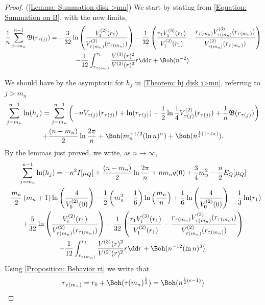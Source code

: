 \begin{proof} (\autoref{Lemma: Summation disk >mn})
	We start by stating from \eqref{Equation: Summation on B}, with the new limits,
	\begin{multline}
					\frac{1}{n} \sum_{j=m_n}^{n-1} \mathfrak{B}(r_{\tau(j)})  = - \frac{3}{32} \ln\left( \frac{V^{(2)}_1(r_1)}{V^{(2)}_{\tau(m_n)}(r_{\tau(m_n)})} \right) - \frac{1}{32} \left( \frac{r_1  V^{(3)}_1(r_1)}{V^{(2)}_1(r_1)} - \frac{r_{\tau(m_n)} V^{(3)}_{\tau(m_n)}(r_{\tau(m_n)})}{V^{(2)}_{\tau(m_n)}(r_{\tau(m_n)})}\right) \\ - \frac{1}{12} \int_{r_{\tau(m_n)}}^{r_1} \frac{V^{(3)}(r)^2}{V^{(2)}(r)^{2}} r \dd r + \Boh(n^{-2}).
	\end{multline}
	
	We should have by the asymptotic for $h_j$ in \autoref{Theorem: hj disk j>mn}, referring to $j > m_n$
	\begin{multline}
		\sum_{j=m_n}^{n-1} \ln (h_j) = 	\sum_{j=m_n}^{n-1}  \left( -n V_{\tau(j)}(r_{\tau(j)}) + \ln(r_{\tau(j)}) -\frac{1}{2} \ln \frac{1}{4}V^{(2)}_{\tau(j)}(r_{\tau(j)}) + \frac{1}{n} \mathfrak{B}(r_{\tau(j)}) \right) \\ + \frac{(n-m_n)}{2} \ln{\frac{2\pi}{n}} + \Boh(m_n^{-1/2} (\ln n)^\alpha) + \Boh(n^{\frac{1}{2}(1-5\epsilon)}).
	\end{multline}
	By the lemmas just proved, we write, as $n \rightarrow \infty$,
	\begin{multline}
		\sum_{j=m_n}^{n-1} \ln (h_j) = -n^2 I[\mu_Q] + \frac{(n-m_n)}{2} \ln{\frac{2\pi}{n}} +  n m_n q(0) + \frac{3}{4} m_n^2 - \frac{n}{2} E_Q[\mu_Q] \\ - \frac{m_n}{2} \left(m_n + 1\right) \ln{\left(\frac{4}{V^{(2)}_0(0)}\right)} - \frac{1}{2} \left( m_n^2 - \frac{1}{6} \right) \ln{\left(\frac{m_n}{n}\right)} + \frac{1}{6} \ln{\left(\frac{4}{V^{(2)}_0(0)}\right)} - \frac{1}{3} \ln(r_1) \\ + \frac{5}{32} \ln\left( \frac{V^{(2)}_1(r_1)}{V^{(2)}_{\tau(m_n)}(r_{\tau(m_n)})} \right) - \frac{1}{32} \left( \frac{r_1  V^{(3)}_1(r_1)}{V^{(2)}_1(r_1)} - \frac{r_{\tau(m_n)} V^{(3)}_{\tau(m_n)}(r_{\tau(m_n)})}{V^{(2)}_{\tau(m_n)}(r_{\tau(m_n)})}\right) \\ - \frac{1}{12} \int_{r_{\tau(m_n)}}^{r_1} \frac{V^{(3)}(r)^2}{V^{(2)}(r)^{2}} r \dd r + \Boh(n^{-12} (\ln n)^3).
	\end{multline}
	Using \autoref{Proposition: Behavior rt} we write that
	\begin{equation}
		r_{\tau(m_n)} = r_0 + \Boh(\tau(m_n)^{\frac{1}{2}}) = \Boh(n^{\frac{1}{2}(\epsilon-1)})

\end{equation}
\end{proof}
